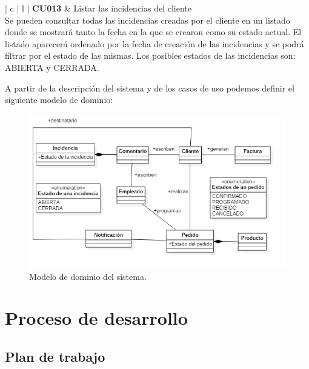\documentclass[11pt,spanish,listoffigures]{tfgetsinf}
\begin{document}
\begin{center}
\begin{tabular}{ | c | l | }
\hline
\textbf{ CU013 } & Listar las incidencias del cliente \\
\hline
{}
{
Se pueden consultar todas las incidencias creadas por el cliente en un listado donde se mostrará tanto la fecha en la que se crearon como su estado actual. El listado aparecerá ordenado por la fecha de creación de las incidencias y se podrá filtrar por el estado de las mismas. Los posibles estados de las incidencias son: ABIERTA y CERRADA.
} \\
\hline
\end{tabular}
\end{center}

A partir de la descripción del sistema y de los casos de uso podemos definir el siguiente modelo de dominio:

\begin{figure}[h]
\centering
\includegraphics[scale=0.5]{modelo_dominio_final}
\caption{Modelo de dominio del sistema.}
\end{figure}

%

\chapter{Proceso de desarrollo}

\section{Plan de trabajo} \label{sct:PlanTrabajo}
\end{document}
